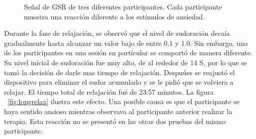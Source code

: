 \begin{figure}[h!]
        \centering
        \caption{Se\~nal de GSR de tres diferentes participantes. Cada participante muestra una reacci\'on diferente a los est\'imulos de ansiedad.}\label{fig:gsrparticipants}
\end{figure}
Durante la fase de relajaci\'on, se observ\'o que el nivel de sudoraci\'on deca\'ia gradualmente hasta alcanzar un valor bajo de entre 0.1 y 1.0. Sin embargo, uno de los participantes en una sesi\'on en part\'icular se comport\'o de manera diferente. Su nivel inicial de sudoraci\'on fue muy alto, de al rededor de 14 \micro S, por lo que se tom\'o la decisi\'on de darle mas tiempo de relajaci\'on. Despu\'ues se reajust\'o el dispositivo para eliminar el sudor acumulado y se le pidi\'o que se volviera a relajar. El tiempo total de relajaci\'on fu\'e de 23:57 minutos. La figura ~\ref{fig:longrelax} ilustra este efecto. Una posible causa es que el participante se haya sentido ansioso mientras observava al participante anterior realizar la terapia. Esta reacci\'on no se present\'o en las otras dos pruebas del mismo participante.


